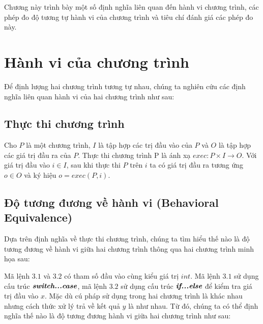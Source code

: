 Chương này trình bày một số định nghĩa liên quan đến hành vi chương trình, các phép đo độ tương tự hành vi của chương trình và tiêu chí đánh giá các phép đo này.

\section{Hành vi của chương trình }
Để định lượng hai chương trình tương tự nhau, chúng ta nghiên cứu các định nghĩa liên quan hành vi của hai chương trình như sau:
	
\subsection{Thực thi chương trình}
\begin{definition}\label{def:progexe}
Cho $P$ là một chương trình, $I$ là tập hợp các trị đầu vào của $P$ và $O$ là tập hợp các giá trị đầu ra của $P$. Thực thi chương trình P là ánh xạ $exec: P \times I \rightarrow O$. Với giá trị đầu vào $i \in I$, sau khi thực thi $P$ trên $i$ ta có giá trị đầu ra tương ứng $o \in O$ và ký hiệu $o = exec(P, i)$.  
\end{definition}

\subsection{Độ tương đương về hành vi (Behavioral Equivalence)}

Dựa trên định nghĩa về thực thi chương trình, chúng ta tìm hiểu thế nào là độ tương đương về hành vi giữa hai chương trình thông qua hai chương trình minh họa sau:

\begin{minipage}[t]{0.45\linewidth}
	
\end{minipage}%
\hfill\vrule\hfill
\begin{minipage}[t]{0.45\linewidth}
	
\end{minipage}%

Mã lệnh $3.1$ và $3.2$ có tham số đầu vào cùng kiểu giá trị $int$. Mã lệnh $3.1$ sử dụng cấu trúc $\textit{\textbf{switch...case}}$, mã lệnh $3.2$ sử dụng cấu trúc $\textit{\textbf{if...else}}$ để kiểm tra giá trị đầu vào $x$. Mặc dù cú pháp sử dụng trong hai chương trình là khác nhau nhưng cách thức xử lý trả về kết quả $y$ là như nhau. Từ đó, chúng ta có thể định nghĩa thế nào là độ tương đương hành vi giữa hai chương trình như sau:

